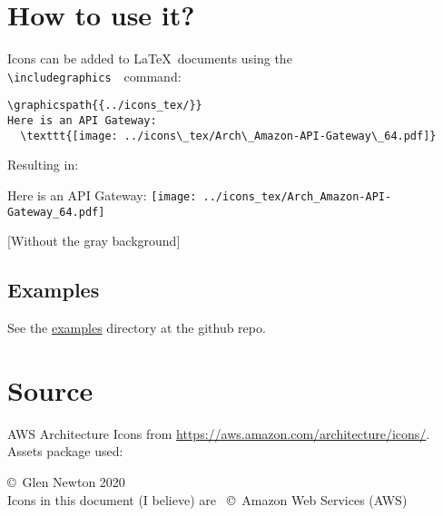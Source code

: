 \documentclass[12pt]{article}
\begin{document}
\section{How to use it?}
Icons can be added to \LaTeX\ documents using the \texttt{{\textbackslash}includegraphics}\ \ command:

\begin{blockquote}
\begin{verbatim}
\graphicspath{{../icons_tex/}}
Here is an API Gateway: 
  \texttt{[image: ../icons\_tex/Arch\_Amazon-API-Gateway\_64.pdf]}
\end{verbatim}
\end{blockquote}

\noindent Resulting in:\\
\begin{blockquote}
Here is an API Gateway:
\texttt{[image: ../icons\_tex/Arch\_Amazon-API-Gateway\_64.pdf]}
\end{blockquote}
    [Without the gray background]
    
\subsection{Examples}
See the \href{https://github.com/gnewton/awsArchIcons2LaTeX/examples}{examples} directory at the github repo.
  
\section{Source}
AWS Architecture Icons from \url{https://aws.amazon.com/architecture/icons/}.\\
Assets package used: \href{https://d1.awsstatic.com/webteam/architecture-icons/Q32020/\assetZipFile}{\assetZipFile}

\vspace{3cm}
\noindent \copyright\ Glen Newton 2020\\
Icons in this document (I believe) are \ \copyright\ Amazon Web Services (AWS)
\vspace{5mm}


\setlength{\parindent}{0pt}




\normalsize

\printindex
\printindex[macros]
\end{document}
